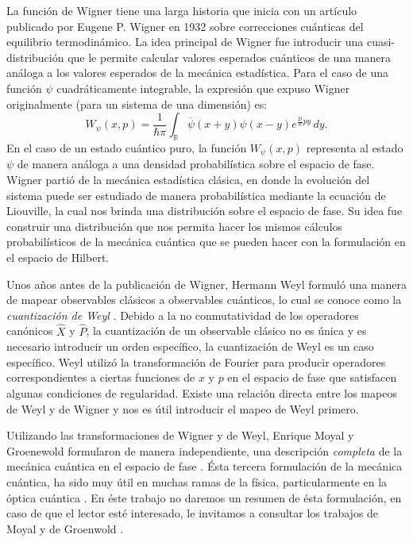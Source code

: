 \documentclass[a4paper,11pt]{report}
\DeclareMathOperator{\R}{\mathbb{R}}
\begin{document}
  La función de Wigner tiene una larga historia que inicia
  con un artículo publicado por Eugene P. Wigner en 1932
  \cite{wigner1932} sobre correcciones cuánticas del
  equilibrio termodinámico. La idea principal de Wigner fue
  introducir una cuasi-distribución que le permite calcular
  valores esperados cuánticos de una manera análoga a los
  valores esperados de la mecánica estadística. Para el caso
  de una función $\psi$ cuadráticamente integrable, la
  expresión que expuso Wigner originalmente (para un sistema
  de una dimensión) es:
  \begin{equation}
    \label{eqn:wigners_original}
    W_\psi(x,p)
    = \frac{1}{\hbar \pi} \int_{\R}
    \overline{\psi}(x+y)\psi(x-y) e^{\frac{2i}{\hbar}py} \,
    dy.
  \end{equation}
  En el caso de un estado cuántico puro, la función
  $W_\psi(x,p)$ representa al estado $\psi$ de manera
  análoga a una densidad probabilística sobre el espacio de
  fase. Wigner partió de la mecánica estadística clásica, en
  donde la evolución del sistema puede ser estudiado de
  manera probabilística mediante la ecuación de Liouville,
  la cual nos brinda una distribución sobre el espacio de
  fase.  Su idea fue construir una distribución que nos
  permita hacer los mismos cálculos probabilísticos de la
  mecánica cuántica que se pueden hacer con la formulación
  en el espacio de Hilbert.

  Unos años antes de la publicación de Wigner, Hermann Weyl
  formuló una manera de mapear observables clásicos a
  observables cuánticos, lo cual se conoce como la
  \textit{cuantización de Weyl} \cite{degosson2021}. Debido
  a la no conmutatividad de los operadores canónicos $\hat
  X$ y $\hat P$, la cuantización de un observable clásico no
  es única y es necesario introducir un orden específico, la
  cuantización de Weyl es un caso específico.  Weyl utilizó
  la transformación de Fourier para producir operadores
  correspondientes a ciertas funciones de $x$ y $p$ en el
  espacio de fase que satisfacen algunas condiciones de
  regularidad. Existe una relación directa entre los mapeos
  de Weyl y de Wigner y nos es útil introducir el mapeo de
  Weyl primero.

  Utilizando las transformaciones de Wigner y de Weyl,
  Enrique Moyal y Groenewold formularon de manera
  independiente, una descripción \textit{completa} de la
  mecánica cuántica en el espacio de fase
  \cite{curtright2012}. Ésta tercera formulación de la
  mecánica cuántica, ha sido muy útil en muchas ramas de la
  física, particularmente en la óptica cuántica
  \cite{zachos2005}. En éste trabajo no daremos un resumen
  de ésta formulación, en caso de que el lector esté
  interesado, le invitamos a consultar los trabajos de Moyal
  \cite{moyal1949} y de Groenwold \cite{groenewold}.
\end{document}
